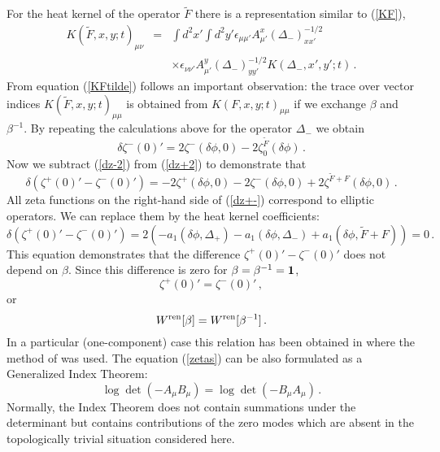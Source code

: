 \documentclass[a4paper,12pt]{article}
\begin{document}
For the heat kernel of the operator $\tilde F$ there is
a representation similar to (\ref{KF}),
\begin{eqnarray}
K(\tilde F,x,y;t)_{\mu\nu} 
&=&\int d^2x'\int d^2y' \epsilon_{\mu\mu'}
 A_{\mu'}^x (\Delta_- )^{-1/2}_{xx'} \nonumber \\
&&\times \epsilon_{\nu\nu'}
A_{\mu'}^y (\Delta_- )^{-1/2}_{yy'} K(\Delta_-,x',y';t)\,.
\label{KFtilde}
\end{eqnarray}
From equation (\ref{KFtilde}) follows an important
observation: the trace over vector indices $K(\tilde F,x,y;t)_{\mu\mu}$
is obtained from $K(F,x,y;t)_{\mu\mu}$ if we exchange 
$\beta$ and $\beta^{-1}$. By repeating the calculations
above for the operator $\Delta_-$ we obtain
\begin{equation}
\delta\zeta^-(0)'=2\zeta^- (\delta \phi ,0)
-2 \zeta^{\tilde F}_0 (\delta\phi ) \,. \label{dz-2}
\end{equation}
Now we subtract (\ref{dz-2}) from (\ref{dz+2}) to
demonstrate that
\begin{equation}
\delta \left( \zeta^+(0)'-\zeta^-(0)'\right)=
-2\zeta^+(\delta\phi ,0)-2\zeta^-(\delta\phi ,0)
+2\zeta^{\tilde F+F} (\delta\phi ,0) \,.
\label{dz+-}
\end{equation}
All zeta functions on the right-hand side of (\ref{dz+-})
correspond to elliptic operators. We can replace them
by the heat kernel coefficients:
\begin{equation}
\delta \left( \zeta^+(0)'-\zeta^-(0)'\right)=
2\left(-a_1(\delta\phi ,\Delta_+)-a_1(\delta\phi ,\Delta_-)
+a_1(\delta\phi ,\tilde F+F)\right)=0\,.
\label{1837}
\end{equation}
This equation demonstrates that the difference
$\zeta^+(0)'-\zeta^-(0)'$ does not depend on $\beta$.
Since this difference is zero for $\beta =\beta^{-1}={\bf 1}$,
\begin{equation}
\zeta^+(0)'=\zeta^-(0)'\,,
\label{zetas}
\end{equation}
or
\begin{equation}
W^{\mbox{\scriptsize ren}}[\beta ]=
W^{\mbox{\scriptsize ren}} [\beta^{-1} ] \,.
\label{symWren}
\end{equation}
In a particular (one-component) case this relation has been
obtained in \cite{SchwarzZeitlin93} where the method of
\cite{Schwarz79} was used.
The equation (\ref{zetas}) can be also formulated as a
Generalized Index Theorem:
\begin{equation}
\log \det (-A_\mu B_\mu )=
\log \det (-B_\mu A_\mu ) \,.
\label{GIT}
\end{equation}
Normally, the Index Theorem does not contain summations
under the determinant but contains contributions
of the zero modes which are absent in the topologically
trivial situation considered here.
\end{document}
